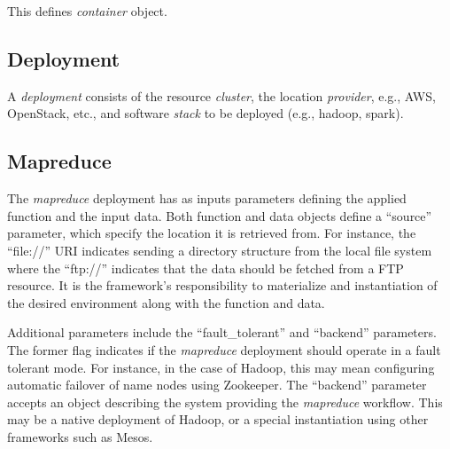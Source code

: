 \documentclass[10pt]{article}
\begin{document}
This defines {\em container} object. 

\subsection{Deployment}

A \textit{deployment} consists of the resource \- \textit{cluster},
the location \- \textit{provider}, e.g., AWS, OpenStack, etc., and
software \textit{stack} to be deployed (e.g., hadoop, spark).


\subsection{Mapreduce}

The \textit{mapreduce} deployment has as inputs parameters defining
the applied function and the input data.  Both function and data
objects define a ``source'' parameter, which specify the location it
is retrieved from. For instance, the ``file://'' URI indicates sending
a directory structure from the local file system where the ``ftp://''
indicates that the data should be fetched from a FTP resource. It is
the framework's responsibility to materialize and instantiation of the
desired environment along with the function and data.


Additional parameters include the ``fault\_tolerant'' and ``backend''
parameters.  The former flag indicates if the \textit{mapreduce}
deployment should operate in a fault tolerant mode. For instance, in
the case of Hadoop, this may mean configuring automatic failover of
name nodes using Zookeeper.  The ``backend'' parameter accepts an
object describing the system providing the \textit{mapreduce}
workflow.  This may be a native deployment of Hadoop, or a special
instantiation using other frameworks such as Mesos.
\end{document}
